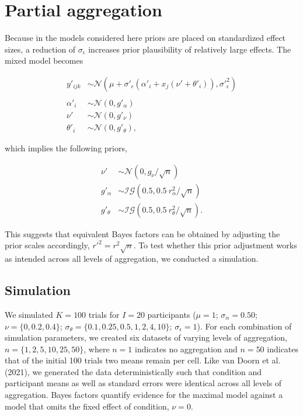 \documentclass[
  man,floatsintext,draftall]{apa6}
\begin{document}
\hypertarget{partial-aggregation}{%
\section{Partial aggregation}\label{partial-aggregation}}

Because in the models considered here priors are placed on standardized effect sizes, a reduction of \(\sigma_\epsilon\) increases prior plausibility of relatively large effects.
The mixed model becomes

\[
\begin{aligned}
y\prime_{ijk} & \sim \mathcal{N}(\mu + \sigma\prime_\epsilon (\alpha\prime_i + x_j (\nu\prime + \theta\prime_i)), \sigma\prime_\epsilon^{2}) \\ & \\
\alpha\prime_i & \sim \mathcal{N}(0, g\prime_\alpha) \\
\nu\prime & \sim \mathcal{N}(0, g\prime_\nu) \\
\theta\prime_i & \sim \mathcal{N}(0, g\prime_\theta),
\end{aligned}
\]

which implies the following priors,

\[
\begin{aligned}
\nu\prime & \sim \mathcal{N}(0, g_{\nu}/\sqrt{n}) \\
g\prime_\alpha & \sim \mathcal{IG}(0.5, 0.5~r^2_{\alpha}/\sqrt{n}) \\
g\prime_\theta & \sim\mathcal{IG}(0.5, 0.5~r^2_{\theta}/\sqrt{n}).
\end{aligned}
\]

This suggests that equivalent Bayes factors can be obtained by adjusting the prior scales accordingly, \(r\prime^2 = r^2 \sqrt{n}\).
To test whether this prior adjustment works as intended across all levels of aggregation, we conducted a simulation.

\hypertarget{simulation}{%
\subsection{Simulation}\label{simulation}}

We simulated \(K = 100\) trials for \(I = 20\) participants (\(\mu = 1\); \(\sigma_\alpha = 0.50\); \(\nu = \{0, 0.2, 0.4\}\); \(\sigma_\theta = \{0.1, 0.25, 0.5, 1, 2, 4, 10\}\); \(\sigma_\epsilon = 1\)).
For each combination of simulation parameters, we created six datasets of varying levels of aggregation, \(n = \{1, 2, 5, 10, 25, 50\}\), where \(n = 1\) indicates no aggregation and \(n = 50\) indicates that of the initial 100 trials two means remain per cell.
Like van Doorn et al. (2021), we generated the data deterministically such that condition and participant means as well as standard errors were identical across all levels of aggregation.
Bayes factors quantify evidence for the maximal model against a model that omits the fixed effect of condition, \(\nu = 0\).
\end{document}

